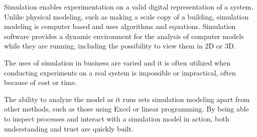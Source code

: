 Simulation enables experimentation on a valid digital representation of a system. Unlike physical modeling, such as making a scale copy of a building, simulation modeling is computer based and uses algorithms and equations. Simulation software provides a dynamic environment for the analysis of computer models while they are running, including the possibility to view them in 2D or 3D.

The uses of simulation in business are varied and it is often utilized when conducting experiments on a real system is impossible or impractical, often because of cost or time.

The ability to analyze the model as it runs sets simulation modeling apart from other methods, such as those using Excel or linear programming. By being able to inspect processes and interact with a simulation model in action, both understanding and trust are quickly built.